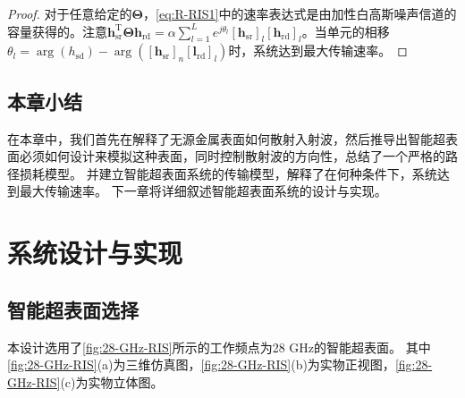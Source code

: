 \documentclass[supercite]{HustGraduPaper}
\begin{document}
\begin{proof}
	对于任意给定的$\boldsymbol{\Theta}$，\autoref{eq:R-RIS1}中的速率表达式是由加性白高斯噪声信道的容量获得的。注意$ \mathbf{h}_{\mathrm{sr}}^{\mathrm{T}} \boldsymbol{\Theta} \mathbf{h}_{\mathrm{rd}} = \alpha \sum_{l=1}^{L} e^{j\theta_l} \left[\mathbf{h}_{\mathrm{sr}}\right]_{l}\left[\mathbf{h}_{\mathrm{rd}}\right]_{l} $。当单元的相移$\theta_{l}=\arg \left(h_{\mathrm{sd}}\right)-\arg \left(\left[\mathbf{h}_{\mathrm{sr}}\right]_{n}\left[\mathbf{l}_{\mathrm{rd}}\right]_{l}\right)$时，系统达到最大传输速率。
\end{proof}

\subsection{本章小结}

在本章中，我们首先在解释了无源金属表面如何散射入射波，然后推导出智能超表面必须如何设计来模拟这种表面，同时控制散射波的方向性，总结了一个严格的路径损耗模型。
并建立智能超表面系统的传输模型，解释了在何种条件下，系统达到最大传输速率。
下一章将详细叙述智能超表面系统的设计与实现。

\section{系统设计与实现}\label{sec:design}

\subsection{智能超表面选择}\label{subsec:28-GHz-RIS}

本设计选用了\autoref{fig:28-GHz-RIS}所示的工作频点为28 GHz的智能超表面。
其中\autoref{fig:28-GHz-RIS}(a)为三维仿真图，\autoref{fig:28-GHz-RIS}(b)为实物正视图，\autoref{fig:28-GHz-RIS}(c)为实物立体图。
\end{document}
